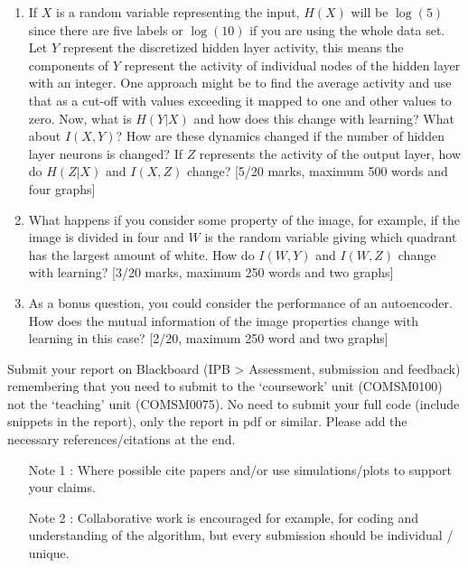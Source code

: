 \documentclass[12pt]{article}
\begin{document}
\begin{enumerate}
\begin{enumerate}
    \item If $X$ is a random variable representing the input, $H(X)$
      will be $\log(5)$ since there are five labels or $\log(10)$ if
      you are using the whole data set. Let $Y$ represent the
      discretized hidden layer activity, this means the components of
      $Y$ represent the activity of individual nodes of the hidden
      layer with an integer. One approach might be to find the average
      activity and use that as a cut-off with values exceeding it
      mapped to one and other values to zero.  Now, what is $H(Y|X)$
      and how does this change with learning? What about $I(X,Y)$? How
      are these dynamics changed if the number of hidden layer neurons
      is changed?  If $Z$ represents the activity of the output layer,
      how do $H(Z|X)$ and $I(X,Z)$ change? [5/20 marks, maximum 500
        words and four graphs]

    \item What happens if you consider some property of the image, for
      example, if the image is divided in four and $W$ is the random
      variable giving which quadrant has the largest amount of
      white. How do $I(W,Y)$ and $I(W,Z)$ change with learning? [3/20
        marks, maximum 250 words and two graphs]

    \item As a bonus question, you could consider the performance of
      an autoencoder. How does the mutual information of the image
      properties change with learning in this case? [2/20, maximum 250 word and two graphs]

\end{enumerate}

\end{enumerate}
 
 Submit your report on Blackboard (IPB > Assessment, submission and
 feedback) remembering that you need to submit to the `coursework'
 unit (COMSM0100) not the `teaching' unit (COMSM0075). No need to
 submit your full code (include snippets in the report), only the
 report in pdf or similar. Please add the necessary
 references/citations at the end.

 
\begin{itemize}
\item[Note 1]: Where possible cite papers and/or use simulations/plots to support your claims. 
\item[Note 2]: Collaborative work is encouraged for example, for coding and understanding of the algorithm, but every submission should be individual / unique. 
\end{itemize}
 
\end{document}
